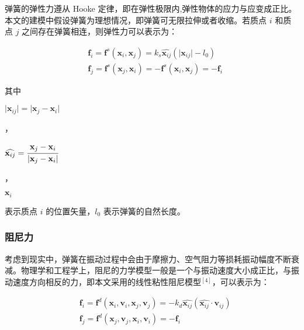 \documentclass[UTF8]{ctexart}
\begin{document}
弹簧的弹性力遵从 Hooke 定律，即在弹性极限内,弹性物体的应力与应变成正比。本文的建模中假设弹簧为理想情况，即弹簧可无限拉伸或者收缩。若质点 $i$ 和质点 $j$ 之间存在弹簧相连，则弹性力可以表示为：

\begin{large}
\begin{equation}
\begin{split}
&\mathbf{f}_i = \mathbf{f}^s(\mathbf{x}_i, \mathbf{x}_j)=k_s \widehat{\mathbf{x}_{ij}} (\lvert \mathbf{x}_{ij} \rvert - l_0) \\
&\mathbf{f}_j = \mathbf{f}^s(\mathbf{x}_j, \mathbf{x}_i)=-\mathbf{f}^s(\mathbf{x}_i, \mathbf{x}_j)=-\mathbf{f}_i
\end{split}
\end{equation}
\end{large}

其中 \begin{large} $\lvert \mathbf{x}_{ij} \rvert = \lvert \mathbf{x}_{j} - \mathbf{x}_{i} \rvert$ \end{large}，\begin{large}$\widehat{\mathbf{x}_{ij}} = \cfrac{\mathbf{x}_{j} - \mathbf{x}_{i}}{ \lvert \mathbf{x}_{j} - \mathbf{x}_{i} \rvert}$ \end{large}，\begin{large}$ \mathbf{x}_i $\end{large} 表示质点 $i$ 的位置矢量，$l_0$ 表示弹簧的自然长度。 \par

\subsubsection{阻尼力}

考虑到现实中，弹簧在振动过程中会由于摩擦力、空气阻力等损耗振动幅度不断衰减。物理学和工程学上，阻尼的力学模型一般是一个与振动速度大小成正比，与振动速度方向相反的力，即本文采用的线性粘性阻尼模型${}^{[4]}$，可以表示为：

\begin{large}
\begin{equation}
\begin{split}
&\mathbf{f}_i = \mathbf{f}^d(\mathbf{x}_i, \mathbf{v}_i, \mathbf{x}_j, \mathbf{v}_j)=-k_d \widehat{\mathbf{x}_{ij}} (\widehat{\mathbf{x}_{ij}} \cdot \mathbf{v}_{ij}) \\
&\mathbf{f}_j = \mathbf{f}^d(\mathbf{x}_j, \mathbf{v}_j, \mathbf{x}_i, \mathbf{v}_i)=-\mathbf{f}_i
\end{split}
\end{equation}
\end{large}
\end{document}
